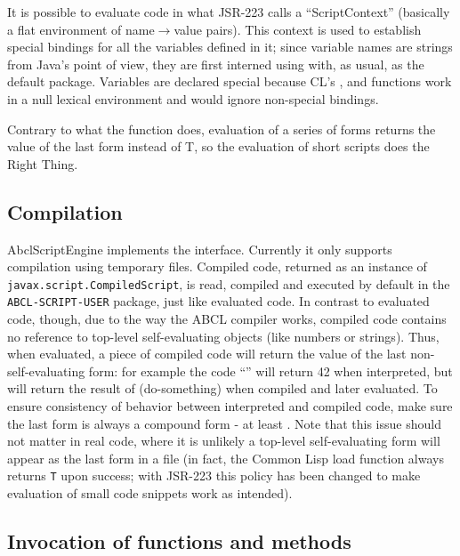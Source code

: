 \documentclass[10pt]{book}
\begin{document}
It is possible to evaluate code in what JSR-223 calls a
``ScriptContext'' (basically a flat environment of name$\rightarrow$value
pairs). This context is used to establish special bindings for all the
variables defined in it; since variable names are strings from Java's
point of view, they are first interned using  with, as
usual,  as the default package. Variables are declared
special because CL's ,  and 
functions work in a null lexical environment and would ignore
non-special bindings.

Contrary to what the function  does, evaluation of a series
of forms returns the value of the last form instead of T, so the
evaluation of short scripts does the Right Thing.

\subsection{Compilation}

AbclScriptEngine implements the 
interface. Currently it only supports compilation using temporary
files. Compiled code, returned as an instance of
\texttt{javax.script.CompiledScript}, is read, compiled and executed by
default in the \texttt{ABCL-SCRIPT-USER} package, just like evaluated
code.  In contrast to evaluated code, though, due to the way the ABCL
compiler works, compiled code contains no reference to top-level
self-evaluating objects (like numbers or strings). Thus, when evaluated,
a piece of compiled code will return the value of the last
non-self-evaluating form: for example the code ``'' will return 42 when interpreted, but will return the result of
(do-something) when compiled and later evaluated. To ensure consistency
of behavior between interpreted and compiled code, make sure the last
form is always a compound form - at least . Note that this issue should not matter in real
code, where it is unlikely a top-level self-evaluating form will appear
as the last form in a file (in fact, the Common Lisp load function
always returns \texttt{T} upon success; with JSR-223 this policy has been changed
to make evaluation of small code snippets work as intended).

\subsection{Invocation of functions and methods}
\end{document}

